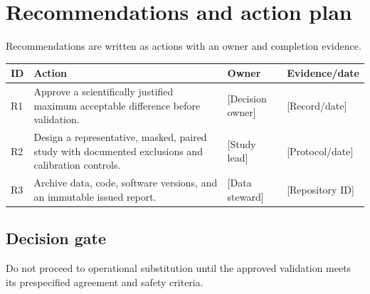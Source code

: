 \chapter{Recommendations and action plan}
\label{chap:recommendations}

Recommendations are written as actions with an owner and completion evidence.

\noindent\begin{tabularx}{\textwidth}{@{}p{8mm}X p{28mm} p{28mm}@{}}
  \toprule
  ID & Action & Owner & Evidence/date \\
  \midrule
  R1 & Approve a scientifically justified maximum acceptable difference before
       validation. & [Decision owner] & [Record/date] \\
  R2 & Design a representative, masked, paired study with documented exclusions
       and calibration controls. & [Study lead] & [Protocol/date] \\
  R3 & Archive data, code, software versions, and an immutable issued report. &
       [Data steward] & [Repository ID] \\
  \bottomrule
\end{tabularx}

\section{Decision gate}
Do not proceed to operational substitution until the approved validation meets
its prespecified agreement and safety criteria.
